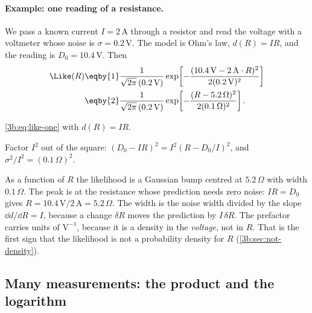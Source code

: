 \paragraph{Example: one reading of a resistance.}
We pass a known current $I=2\,$A through a resistor and read the voltage
with a voltmeter whose noise is $\sigma=0.2\,$V. The model is Ohm's law,
$d(R)=IR$, and the reading is $D_0=10.4\,$V. Then
\begin{align*}
  \Like(R)
  &\eqby{1}\frac{1}{\sqrt{2\pi}\,(0.2\,\mathrm V)}
     \exp\!\left[-\frac{(10.4\,\mathrm V-2\,\mathrm A\cdot R)^2}{2(0.2\,\mathrm V)^2}\right]\\
  &\eqby{2}\frac{1}{\sqrt{2\pi}\,(0.2\,\mathrm V)}
     \exp\!\left[-\frac{(R-5.2\,\Omega)^2}{2(0.1\,\Omega)^2}\right].
\end{align*}
\begin{explain}
  \item \eqref{3b:eq:like-one} with $d(R)=IR$.
  \item Factor $I^2$ out of the square:
        $(D_0-IR)^2=I^2(R-D_0/I)^2$, and $\sigma^2/I^2=(0.1\,\Omega)^2$.
\end{explain}
As a function of $R$ the likelihood is a Gaussian bump centred at
$5.2\,\Omega$ with width $0.1\,\Omega$. The peak is at the resistance whose
prediction needs zero noise: $IR=D_0$ gives $R=10.4\,\mathrm V/2\,\mathrm
A=5.2\,\Omega$. The width is the noise width divided by the slope
$\dd d/\dd R=I$, because a change $\delta R$ moves the prediction by
$I\,\delta R$. The prefactor carries units of $\mathrm{V}^{-1}$, because it
is a density in the \emph{voltage}, not in $R$. That is the first sign that
the likelihood is not a probability density for $R$
(\cref{3b:sec:not-density}).

\subsection{Many measurements: the product and the logarithm}
\label{3b:sec:product}

